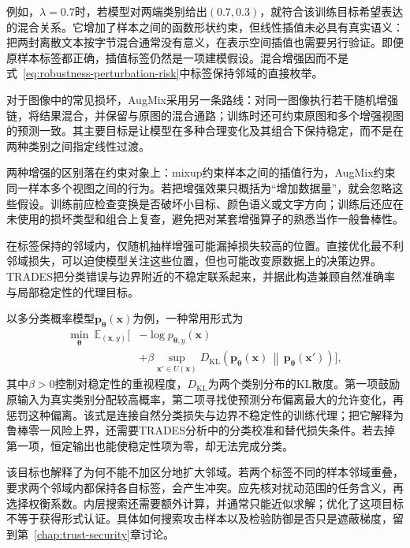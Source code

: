例如，$\lambda=0.7$时，若模型对两端类别给出$(0.7,0.3)$，就符合该训练目标希望表达的混合关系。它增加了样本之间的函数形状约束，但线性插值未必具有真实语义：把两封离散文本按字节混合通常没有意义，在表示空间插值也需要另行验证。即便原样本标签都正确，插值标签仍然是一项建模假设。混合增强因而不是式~\eqref{eq:robustness-perturbation-risk}中标签保持邻域的直接枚举。

对于图像中的常见损坏，AugMix采用另一条路线：对同一图像执行若干随机增强链，将结果混合，并保留与原图的混合通路；训练时还可约束原图和多个增强视图的预测一致。其主要目标是让模型在多种合理变化及其组合下保持稳定，而不是在两种类别之间指定线性过渡。

两种增强的区别落在约束对象上：mixup约束样本之间的插值行为，AugMix约束同一样本多个视图之间的行为。若把增强效果只概括为“增加数据量”，就会忽略这些假设。训练前应检查变换是否破坏小目标、颜色语义或文字方向；训练后还应在未使用的损坏类型和组合上复查，避免把对某套增强算子的熟悉当作一般鲁棒性。

在标签保持的邻域内，仅随机抽样增强可能漏掉损失较高的位置。直接优化最不利邻域损失，可以迫使模型关注这些位置，但也可能改变原数据上的决策边界。TRADES把分类错误与边界附近的不稳定联系起来，并据此构造兼顾自然准确率与局部稳定性的代理目标。

以多分类概率模型$\bm{p}_{\bm{\theta}}(\bm{x})$为例，一种常用形式为
\begin{equation}
 \begin{aligned}
 \min_{\bm{\theta}}\ \mathbb E_{(\bm{x},y)}
 \bigg[&-\log p_{\bm{\theta},y}(\bm{x})\\
 &+\beta\sup_{\bm{x}'\in U(\bm{x})}
 D_{\mathrm{KL}}\!\left(
 \bm{p}_{\bm{\theta}}(\bm{x})
 \,\middle\|\,
 \bm{p}_{\bm{\theta}}(\bm{x}')\right)\bigg],
 \end{aligned}
 \label{eq:robustness-trades}
\end{equation}
其中$\beta>0$控制对稳定性的重视程度，$D_{\mathrm{KL}}$为两个类别分布的KL散度。第一项鼓励原输入为真实类别分配较高概率，第二项寻找使预测分布偏离最大的允许变化，再惩罚这种偏离。该式是连接自然分类损失与边界不稳定性的训练代理；把它解释为鲁棒零一风险上界，还需要TRADES分析中的分类校准和替代损失条件。若去掉第一项，恒定输出也能使稳定性项为零，却无法完成分类。

该目标也解释了为何不能不加区分地扩大邻域。若两个标签不同的样本邻域重叠，要求两个邻域内都保持各自标签，会产生冲突。应先核对扰动范围的任务含义，再选择权衡系数。内层搜索还需要额外计算，并通常只能近似求解；优化了这项目标不等于获得形式认证。具体如何搜索攻击样本以及检验防御是否只是遮蔽梯度，留到第~\ref{chap:trust-security}章讨论。


